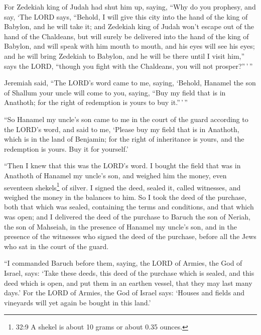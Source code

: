  For Zedekiah king of Judah had shut him up, saying, ``Why
do you prophesy, and say, `The LORD says, ``Behold, I will give this
city into the hand of the king of Babylon, and he will take it;
 and Zedekiah king of Judah won't escape out of the hand of
the Chaldeans, but will surely be delivered into the hand of the king of
Babylon, and will speak with him mouth to mouth, and his eyes will see
his eyes;  and he will bring Zedekiah to Babylon, and he
will be there until I visit him,'' says the LORD, ``though you fight
with the Chaldeans, you will not prosper?''\,'\,''

 Jeremiah said, ``The LORD's word came to me, saying,
 `Behold, Hanamel the son of Shallum your uncle will come to
you, saying, ``Buy my field that is in Anathoth; for the right of
redemption is yours to buy it.''\,'\,''

 ``So Hanamel my uncle's son came to me in the court of the
guard according to the LORD's word, and said to me, `Please buy my field
that is in Anathoth, which is in the land of Benjamin; for the right of
inheritance is yours, and the redemption is yours. Buy it for yourself.'

``Then I knew that this was the LORD's word.  I bought the
field that was in Anathoth of Hanamel my uncle's son, and weighed him
the money, even seventeen shekels\footnote{32:9 A shekel is about 10
  grams or about 0.35 ounces.} of silver.  I signed the
deed, sealed it, called witnesses, and weighed the money in the balances
to him.  So I took the deed of the purchase, both that
which was sealed, containing the terms and conditions, and that which
was open;  and I delivered the deed of the purchase to
Baruch the son of Neriah, the son of Mahseiah, in the presence of
Hanamel my uncle's son, and in the presence of the witnesses who signed
the deed of the purchase, before all the Jews who sat in the court of
the guard.

 ``I commanded Baruch before them, saying, 
the LORD of Armies, the God of Israel, says: `Take these deeds, this
deed of the purchase which is sealed, and this deed which is open, and
put them in an earthen vessel, that they may last many days.'
 For the LORD of Armies, the God of Israel says: `Houses
and fields and vineyards will yet again be bought in this land.'

